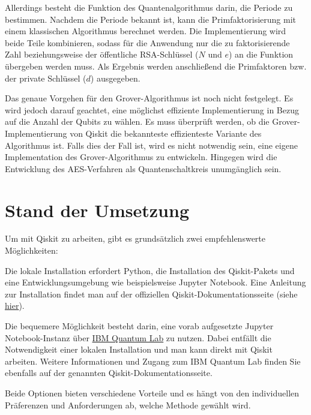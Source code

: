 \documentclass[lettersize,journal]{IEEEtran}
\begin{document}
Allerdings besteht die Funktion des Quantenalgorithmus darin,
die Periode zu bestimmen.
Nachdem die Periode bekannt ist,
kann die Primfaktorisierung mit einem klassischen Algorithmus berechnet werden.
Die Implementierung wird beide Teile kombinieren,
sodass für die Anwendung nur die zu faktorisierende Zahl beziehungsweise
der öffentliche RSA-Schlüssel (\(N\) und \(e\)) an die Funktion übergeben werden muss.
Als Ergebnis werden anschließend die Primfaktoren bzw. der private Schlüssel (\(d\)) ausgegeben.

Das genaue Vorgehen für den Grover-Algorithmus ist noch nicht festgelegt.
Es wird jedoch darauf geachtet, eine möglichst effiziente Implementierung in Bezug auf die Anzahl der Qubits zu wählen.
Es muss überprüft werden, ob die Grover-Implementierung von Qiskit die bekannteste effizienteste Variante des Algorithmus ist.
Falls dies der Fall ist, wird es nicht notwendig sein,
eine eigene Implementation des Grover-Algorithmus zu entwickeln.
Hingegen wird die Entwicklung des AES-Verfahren als Quantenschaltkreis unumgänglich sein.

\section{Stand der Umsetzung}

Um mit Qiskit zu arbeiten, gibt es grundsätzlich zwei empfehlenswerte Möglichkeiten:
\begin{description}[style=nextline]
\item[Lokale Installation]
Die lokale Installation erfordert Python,
die Installation des Qiskit-Pakets und eine Entwicklungsumgebung wie beispielsweise Jupyter Notebook.
Eine Anleitung zur Installation findet man auf der offiziellen Qiskit-Dokumentationsseite
(siehe \href{https://qiskit.org/documentation/stable/0.24/install.html}{hier}).
\item[IBM Quantum Lab]
Die bequemere Möglichkeit besteht darin,
eine vorab aufgesetzte Jupyter Notebook-Instanz über
\href{https://qiskit.org/documentation/stable/0.24/install.html}{IBM Quantum Lab}
zu nutzen.
Dabei entfällt die Notwendigkeit einer lokalen Installation und man kann direkt mit Qiskit arbeiten.
Weitere Informationen und Zugang zum IBM Quantum Lab finden Sie ebenfalls auf der genannten Qiskit-Dokumentationsseite.
\end{description}
Beide Optionen bieten verschiedene Vorteile und es hängt von den individuellen Präferenzen und Anforderungen ab,
welche Methode gewählt wird.
\end{document}
